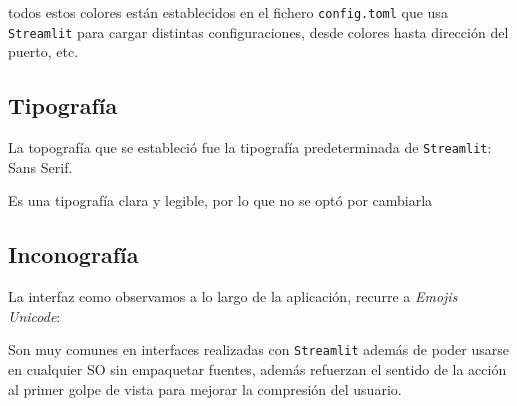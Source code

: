 todos estos colores están establecidos en el fichero \texttt{config.toml} que usa \texttt{Streamlit} para cargar distintas configuraciones, desde colores hasta dirección del puerto, etc.

\subsection{Tipografía}
La topografía que se estableció fue la tipografía predeterminada de \texttt{Streamlit}: Sans Serif.

Es una tipografía clara y legible, por lo que no se optó por cambiarla

\subsection{Inconografía}

La interfaz como observamos a lo largo de la aplicación, recurre a \textit{Emojis Unicode}:



Son muy comunes en interfaces realizadas con \texttt{Streamlit} además de poder usarse en cualquier SO sin empaquetar fuentes, además refuerzan el sentido de la acción al primer golpe de vista para mejorar la compresión del usuario.
